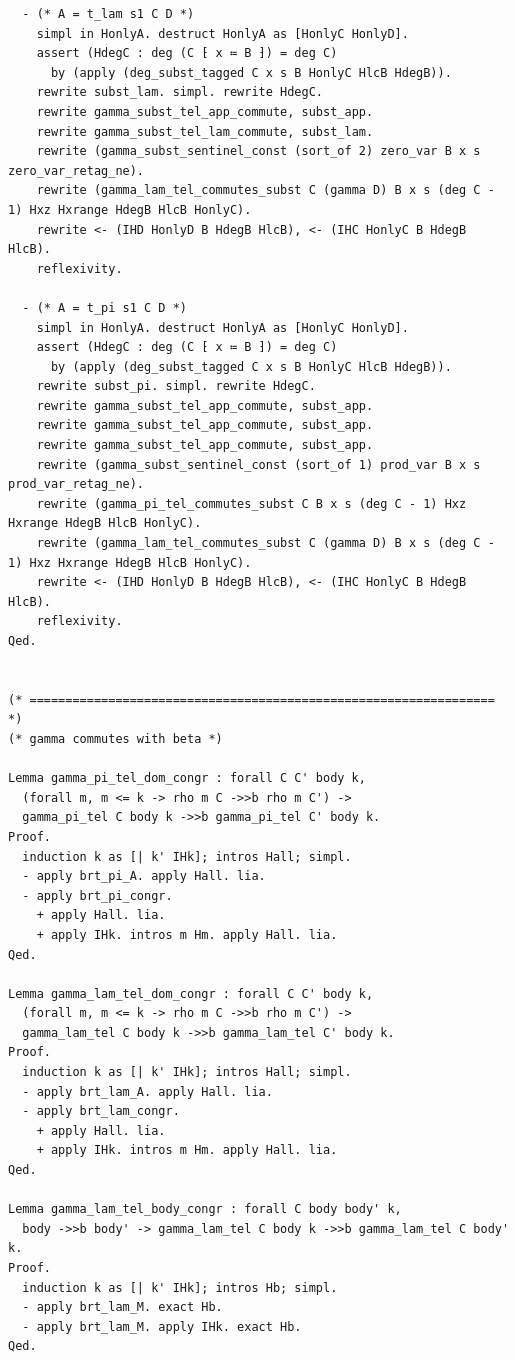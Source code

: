 \begin{latin}
\begin{verbatim}
  - (* A = t_lam s1 C D *)
    simpl in HonlyA. destruct HonlyA as [HonlyC HonlyD].
    assert (HdegC : deg (C ⁅ x ≔ B ⁆) = deg C)
      by (apply (deg_subst_tagged C x s B HonlyC HlcB HdegB)).
    rewrite subst_lam. simpl. rewrite HdegC.
    rewrite gamma_subst_tel_app_commute, subst_app.
    rewrite gamma_subst_tel_lam_commute, subst_lam.
    rewrite (gamma_subst_sentinel_const (sort_of 2) zero_var B x s zero_var_retag_ne).
    rewrite (gamma_lam_tel_commutes_subst C (gamma D) B x s (deg C - 1) Hxz Hxrange HdegB HlcB HonlyC).
    rewrite <- (IHD HonlyD B HdegB HlcB), <- (IHC HonlyC B HdegB HlcB).
    reflexivity.

  - (* A = t_pi s1 C D *)
    simpl in HonlyA. destruct HonlyA as [HonlyC HonlyD].
    assert (HdegC : deg (C ⁅ x ≔ B ⁆) = deg C)
      by (apply (deg_subst_tagged C x s B HonlyC HlcB HdegB)).
    rewrite subst_pi. simpl. rewrite HdegC.
    rewrite gamma_subst_tel_app_commute, subst_app.
    rewrite gamma_subst_tel_app_commute, subst_app.
    rewrite gamma_subst_tel_app_commute, subst_app.
    rewrite (gamma_subst_sentinel_const (sort_of 1) prod_var B x s prod_var_retag_ne).
    rewrite (gamma_pi_tel_commutes_subst C B x s (deg C - 1) Hxz Hxrange HdegB HlcB HonlyC).
    rewrite (gamma_lam_tel_commutes_subst C (gamma D) B x s (deg C - 1) Hxz Hxrange HdegB HlcB HonlyC).
    rewrite <- (IHD HonlyD B HdegB HlcB), <- (IHC HonlyC B HdegB HlcB).
    reflexivity.
Qed.


(* ================================================================= *)
(* gamma commutes with beta *)

Lemma gamma_pi_tel_dom_congr : forall C C' body k,
  (forall m, m <= k -> rho m C ->>b rho m C') ->
  gamma_pi_tel C body k ->>b gamma_pi_tel C' body k.
Proof.
  induction k as [| k' IHk]; intros Hall; simpl.
  - apply brt_pi_A. apply Hall. lia.
  - apply brt_pi_congr.
    + apply Hall. lia.
    + apply IHk. intros m Hm. apply Hall. lia.
Qed.

Lemma gamma_lam_tel_dom_congr : forall C C' body k,
  (forall m, m <= k -> rho m C ->>b rho m C') ->
  gamma_lam_tel C body k ->>b gamma_lam_tel C' body k.
Proof.
  induction k as [| k' IHk]; intros Hall; simpl.
  - apply brt_lam_A. apply Hall. lia.
  - apply brt_lam_congr.
    + apply Hall. lia.
    + apply IHk. intros m Hm. apply Hall. lia.
Qed.

Lemma gamma_lam_tel_body_congr : forall C body body' k,
  body ->>b body' -> gamma_lam_tel C body k ->>b gamma_lam_tel C body' k.
Proof.
  induction k as [| k' IHk]; intros Hb; simpl.
  - apply brt_lam_M. exact Hb.
  - apply brt_lam_M. apply IHk. exact Hb.
Qed.


\end{verbatim}
\end{latin}
